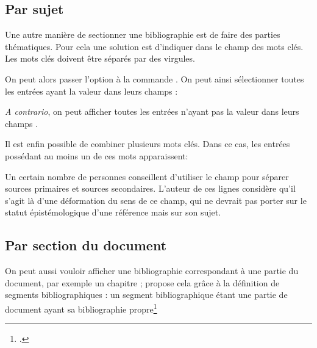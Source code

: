 \subsection{Par sujet}

Une autre manière de  sectionner une bibliographie est de faire des parties thématiques. Pour cela une solution est d'indiquer dans le champ   des mots clés. Les mots clés doivent être séparés par des virgules.

On peut alors passer l'option  à la commande . On peut ainsi sélectionner toutes les entrées ayant la valeur  dans leurs champs  :

\begin{latexcode}
\printbibliography[keyword=xxx]
\end{latexcode}

\emph{A contrario}, on peut afficher toutes les entrées n'ayant pas la valeur  dans leurs champs .

\begin{latexcode}
\printbibliography[notkeyword=xxx]
\end{latexcode}

Il est enfin possible de combiner plusieurs mots clés. Dans ce cas, les entrées possédant au moins un de ces mots apparaissent:

\begin{latexcode}
\printbibliography[keyword=positivistes, keyword=naturalistes]
\end{latexcode}

\begin{plusloins}
	Un certain nombre de personnes conseillent d'utiliser le champ  pour séparer sources primaires et sources secondaires. L'auteur de ces lignes considère qu'il s'agit là d'une déformation du sens de ce champ, qui ne devrait pas porter sur le statut épistémologique d'une référence mais sur son sujet. 
\end{plusloins}

\subsection{Par section du document}

On peut aussi vouloir afficher une bibliographie correspondant à une partie du document, par exemple un chapitre ;  propose cela grâce à la définition de segments bibliographiques : un segment bibliographique étant une partie de document ayant sa bibliographie propre\footcites[En réalité  propose deux choses différentes : \enquote{segment} et \enquote{section} bibliographique. Seules les sections bibliographiques ont réellement une bibliographie propre, dans la mesure où, si on utilise un style numéroté de bibliographie, la numérotation recommence à chaque changement de section, mais pas à chaque changement de segment. Toutefois il est rare en science humaine d'utiliser un style bibliographique numéroté. C'est pourquoi nous ne parlons ici que des segments bibliographiques et non pas des sections bibliographiques. Voir :][]{biblatex_section}{biblatex_segment}

